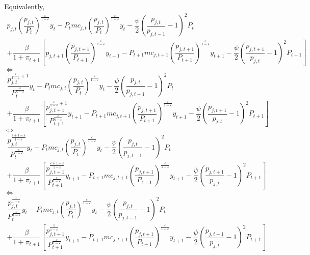 \documentclass{article}
\begin{document}
Equivalently,
\begin{multline*}
    p_{j,t}\left(\dfrac{p_{j,t}}{P_{t}}\right)^{\frac{\varepsilon}{1-\varepsilon}}y_{t}-P_{t}mc_{j,t}\left(\dfrac{p_{j,t}}{P_{t}}\right)^{\frac{\varepsilon}{1-\varepsilon}}y_{t}-\dfrac{\psi}{2}\left(\dfrac{p_{j,t}}{p_{j,t-1}}-1\right)^{2}P_{t}\\
    +\dfrac{\beta}{1+\pi_{t+1}}\left[p_{j,t+1}\left(\dfrac{p_{j,t+1}}{P_{t+1}}\right)^{\frac{\varepsilon}{1-\varepsilon}}y_{t+1}-P_{t+1}mc_{j,t+1}\left(\dfrac{p_{j,t+1}}{P_{t+1}}\right)^{\frac{\varepsilon}{1-\varepsilon}}y_{t+1}-\dfrac{\psi}{2}\left(\dfrac{p_{j,t+1}}{p_{j,t}}-1\right)^{2}P_{t+1}\right]
\end{multline*}
$\iff$
\begin{multline*}
    \dfrac{p_{j,t}^{\frac{\varepsilon}{1-\varepsilon}+1}}{P_{t}^{\frac{\varepsilon}{1-\varepsilon}}}y_{t}-P_{t}mc_{j,t}\left(\dfrac{p_{j,t}}{P_{t}}\right)^{\frac{\varepsilon}{1-\varepsilon}}y_{t}-\dfrac{\psi}{2}\left(\dfrac{p_{j,t}}{p_{j,t-1}}-1\right)^{2}P_{t}\\
    +\dfrac{\beta}{1+\pi_{t+1}}\left[\dfrac{p_{j,t+1}^{\frac{\varepsilon}{1-\varepsilon}+1}}{P_{t+1}^{\frac{\varepsilon}{1-\varepsilon}}}y_{t+1}-P_{t+1}mc_{j,t+1}\left(\dfrac{p_{j,t+1}}{P_{t+1}}\right)^{\frac{\varepsilon}{1-\varepsilon}}y_{t+1}-\dfrac{\psi}{2}\left(\dfrac{p_{j,t+1}}{p_{j,t}}-1\right)^{2}P_{t+1}\right]
\end{multline*}
$\iff$
\begin{multline*}
    \dfrac{p_{j,t}^{\frac{\varepsilon+1-\varepsilon}{1-\varepsilon}}}{P_{t}^{\frac{\varepsilon}{1-\varepsilon}}}y_{t}-P_{t}mc_{j,t}\left(\dfrac{p_{j,t}}{P_{t}}\right)^{\frac{\varepsilon}{1-\varepsilon}}y_{t}-\dfrac{\psi}{2}\left(\dfrac{p_{j,t}}{p_{j,t-1}}-1\right)^{2}P_{t}\\
    +\dfrac{\beta}{1+\pi_{t+1}}\left[\dfrac{p_{j,t+1}^{\frac{\varepsilon+1-\varepsilon}{1-\varepsilon}}}{P_{t+1}^{\frac{\varepsilon}{1-\varepsilon}}}y_{t+1}-P_{t+1}mc_{j,t+1}\left(\dfrac{p_{j,t+1}}{P_{t+1}}\right)^{\frac{\varepsilon}{1-\varepsilon}}y_{t+1}-\dfrac{\psi}{2}\left(\dfrac{p_{j,t+1}}{p_{j,t}}-1\right)^{2}P_{t+1}\right]
\end{multline*}
$\iff$
\begin{multline*}
    \dfrac{p_{j,t}^{\frac{1}{1-\varepsilon}}}{P_{t}^{\frac{\varepsilon}{1-\varepsilon}}}y_{t}-P_{t}mc_{j,t}\left(\dfrac{p_{j,t}}{P_{t}}\right)^{\frac{\varepsilon}{1-\varepsilon}}y_{t}-\dfrac{\psi}{2}\left(\dfrac{p_{j,t}}{p_{j,t-1}}-1\right)^{2}P_{t}\\
    +\dfrac{\beta}{1+\pi_{t+1}}\left[\dfrac{p_{j,t+1}^{\frac{1}{1-\varepsilon}}}{P_{t+1}^{\frac{\varepsilon}{1-\varepsilon}}}y_{t+1}-P_{t+1}mc_{j,t+1}\left(\dfrac{p_{j,t+1}}{P_{t+1}}\right)^{\frac{\varepsilon}{1-\varepsilon}}y_{t+1}-\dfrac{\psi}{2}\left(\dfrac{p_{j,t+1}}{p_{j,t}}-1\right)^{2}P_{t+1}\right]
\end{multline*}
\end{document}
